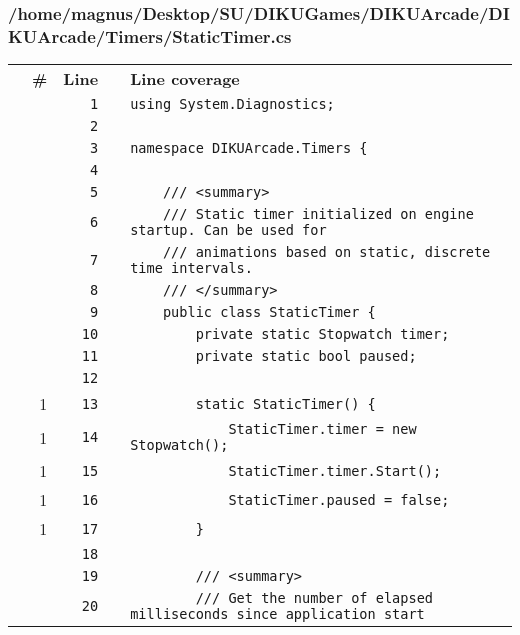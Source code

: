 \documentclass[a4paper,landscape,10pt]{article}
\begin{document}
\subsubsection{/home/magnus/Desktop/SU/DIKUGames/DIKUArcade/DIKUArcade/Timers/StaticTimer.cs}
\begin{longtable}[l]{lrrll}
\textbf{} & \textbf{\#} & \textbf{Line} & \textbf{} & \textbf{Line coverage}\\
\cellcolor{gray} &  & \verb~1~ & & \verb~using System.Diagnostics;~\\
\cellcolor{gray} &  & \verb~2~ & & \verb~~\\
\cellcolor{gray} &  & \verb~3~ & & \verb~namespace DIKUArcade.Timers {~\\
\cellcolor{gray} &  & \verb~4~ & & \verb~~\\
\cellcolor{gray} &  & \verb~5~ & & \verb~    /// <summary>~\\
\cellcolor{gray} &  & \verb~6~ & & \verb~    /// Static timer initialized on engine startup. Can be used for~\\
\cellcolor{gray} &  & \verb~7~ & & \verb~    /// animations based on static, discrete time intervals.~\\
\cellcolor{gray} &  & \verb~8~ & & \verb~    /// </summary>~\\
\cellcolor{gray} &  & \verb~9~ & & \verb~    public class StaticTimer {~\\
\cellcolor{gray} &  & \verb~10~ & & \verb~        private static Stopwatch timer;~\\
\cellcolor{gray} &  & \verb~11~ & & \verb~        private static bool paused;~\\
\cellcolor{gray} &  & \verb~12~ & & \verb~~\\
\cellcolor{green} & 1 & \verb~13~ & & \verb~        static StaticTimer() {~\\
\cellcolor{green} & 1 & \verb~14~ & & \verb~            StaticTimer.timer = new Stopwatch();~\\
\cellcolor{green} & 1 & \verb~15~ & & \verb~            StaticTimer.timer.Start();~\\
\cellcolor{green} & 1 & \verb~16~ & & \verb~            StaticTimer.paused = false;~\\
\cellcolor{green} & 1 & \verb~17~ & & \verb~        }~\\
\cellcolor{gray} &  & \verb~18~ & & \verb~~\\
\cellcolor{gray} &  & \verb~19~ & & \verb~        /// <summary>~\\
\cellcolor{gray} &  & \verb~20~ & & \verb~        /// Get the number of elapsed milliseconds since application start~\\

\end{longtable}
\end{document}

